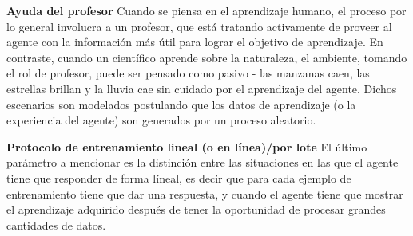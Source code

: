 \textbf{Ayuda del profesor} Cuando se piensa en el aprendizaje humano,
el proceso por lo general involucra a un profesor, que
está tratando activamente de proveer al agente con la información más útil
para lograr el objetivo de aprendizaje. En contraste, cuando un científico
aprende sobre la naturaleza, el ambiente, tomando el rol de profesor,
puede ser pensado como pasivo - las manzanas caen, las estrellas
brillan y la lluvia cae sin cuidado por el aprendizaje del agente.
Dichos escenarios son modelados postulando que los datos de aprendizaje
(o la experiencia del agente) son generados por un proceso aleatorio.

\textbf{Protocolo de entrenamiento lineal (o en línea)/por lote} El
último parámetro a mencionar es la distinción entre las situaciones en
las que el agente tiene que responder de forma líneal, es decir
que para cada ejemplo de entrenamiento tiene que dar una respuesta, y
cuando el agente tiene que mostrar el aprendizaje adquirido
después de tener la oportunidad de procesar grandes cantidades de datos.
